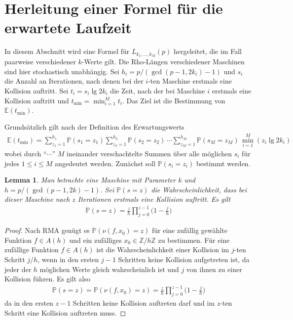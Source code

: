 \documentclass[a4paper, 11pt, ngerman]{article}
\newcommand{\E}{\mathbb{E}}
\newcommand{\Z}{\mathbb{Z}}
\renewcommand{\P}{\mathbb{P}}
\theoremstyle{definition}
\theoremstyle{plain}
\newtheorem{lemma}{Lemma}
\theoremstyle{remark}
\begin{document}
\section{Herleitung einer Formel für die erwartete Laufzeit}
\label{sec:formula-running-time}

In diesem Abschnitt wird eine Formel für $L_{k_1, \dots, k_M}(p)$ hergeleitet, die im Fall paarweise verschiedener $k$-Werte gilt. Die Rho-Längen verschiedener Maschinen sind hier stochastisch unabhängig. Sei $h_i = p/(\gcd(p - 1, 2k_i) - 1)$ und $s_i$ die Anzahl an Iterationen, nach denen bei der $i$-ten Maschine erstmals eine Kollision auftritt. Sei $t_i = s_i \lg 2k_i$ die Zeit, nach der bei Maschine $i$ erstmals eine Kollision auftritt und $t_{\min} = \min_{i = 1}^M t_i$. Das Ziel ist die Bestimmung von $\E(t_{\min})$.

Grundsätzlich gilt nach der Definition des Erwartungswerts
\begin{align}
    \E(t_{\min}) =
    \sum_{z_1 = 1}^{h_1} \P(s_1 = z_1)
    \sum_{z_2 = 1}^{h_2} \P(s_2 = z_2) \, \cdots
    \sum_{z_M = 1}^{h_M} \P(s_M = z_M)
    \, \min_{i = 1}^M(z_i \lg 2k_i)
    \label{formula:etmin-initial}
\end{align}
wobei durch "`$\cdots$"' $M$ ineinander verschachtelte Summen über alle möglichen $s_i$ für jedes $1 \le i \le M$ angedeutet werden. Zunächst soll $\P(s_i = z_i)$ bestimmt werden.

\begin{lemma}
    Man betrachte eine Maschine mit Parameter $k$ und $h = p/(\gcd(p - 1, 2k) - 1)$. Sei $\P(s = z)$ die Wahrscheinlichkeit, dass bei dieser Maschine nach $z$ Iterationen erstmals eine Kollision auftritt. Es gilt
    \begin{align*}
        \P(s = z) = \frac z h \prod_{j = 0}^{z - 1} \bigg (1 - \frac j h \bigg )
    \end{align*}
    \label{lemma:prob-s-z}
\end{lemma}

\begin{proof}
    Nach RMA genügt es $\P(\nu(f, x_0) = z)$ für eine zufällig gewählte Funktion $f \in A(h)$ und ein zufälliges $x_0 \in \Z/h\Z$ zu bestimmen. Für eine zufällige Funktion $f \in A(h)$ ist die Wahrscheinlichkeit einer Kollision im $j$-ten Schritt $j/h$, wenn in den ersten $j - 1$ Schritten keine Kollision aufgetreten ist, da jeder der $h$ möglichen Werte gleich wahrscheinlich ist und $j$ von ihnen zu einer Kollision führen. Es gilt also
    \begin{align*}
        \P(s = z) = \P(\nu(f, x_0) = z)
        = \frac z h \prod_{j = 0}^{z - 1} \bigg (1 - \frac j h \bigg )
    \end{align*}
    da in den ersten $z - 1$ Schritten keine Kollision auftreten darf und im $z$-ten Schritt eine Kollision auftreten muss.
\end{proof}
\end{document}
